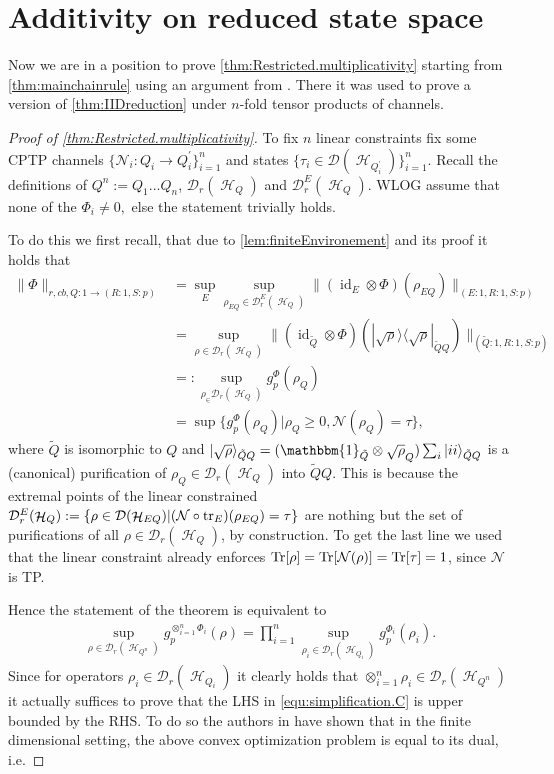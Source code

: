 \documentclass[11pt]{article}
\DeclareMathOperator{\id}{id}
\newcommand{\1}{\ensuremath{\mathbbm{1}}}
\theoremstyle{newdefinition}
\theoremstyle{newplain}
\theoremstyle{myplain}
\DeclareMathOperator{\cH}{\mathcal{H}}
\begin{document}
\section{Additivity on reduced state space}\label{app:Additivity.on.reduced.operator.spaces}


Now we are in a position to prove \cref{thm:Restricted.multiplicativity} starting from \cref{thm:mainchainrule} using an argument from \cite{Himbeeck.2025}. There it was used to prove a version of \cref{thm:IIDreduction} under $n$-fold tensor products of channels.
\begin{proof}[Proof of \cref{thm:Restricted.multiplicativity}]
To fix $n$ linear constraints fix some CPTP channels $\{\mathcal{N}_i:Q_i\to Q^\prime_i\}_{i=1}^n$ and states $\{\tau_i\in\mathcal{D}(\cH_{Q^\prime_i})\}_{i=1}^n$. Recall the definitions of $Q^n:=Q_1...Q_n$, $\mathcal{D}_r(\cH_{Q})$ and $\mathcal{D}^E_r(\cH_{Q})$.
WLOG assume that none of the $\Phi_i\neq 0,$ else the statement trivially holds.

To do this we first recall, that due to \cref{lem:finiteEnvironement} and its proof it holds that 
\begin{align}
   \|\Phi\|_{r,cb,Q:1\to(R:1,S:p)} &= \sup_{E}\sup_{\rho_{EQ}\in\mathcal{D}^E_r(\cH_Q)}\|(\id_E\otimes\Phi)(\rho_{EQ})\|_{(E:1,R:1,S:p)} \\ &= \sup_{\rho\in\mathcal{D}_r(\cH_Q)}\|(\id_{\tilde{Q}}\otimes\Phi)(|\sqrt{\rho}\rangle\langle\sqrt{\rho}|_{\tilde{Q}Q})\|_{(\tilde{Q}:1,R:1,S:p)} \\
   &=:\sup_{\rho_\in\mathcal{D}_r(\cH_{Q})}g_p^{\Phi}(\rho_Q) \\ &=\sup\{g_p^\Phi(\rho_Q)| \rho_Q\geq 0, \mathcal{N}(\rho_Q)=\tau\},
\end{align} where $\tilde{Q}$ is isomorphic to $Q$ and $|\sqrt{\rho}\rangle_{\tilde{Q}Q}=(\1_{\tilde{Q}}\otimes\sqrt{\rho}_Q)\sum_{i}|ii\rangle_{\tilde{Q} Q}$ is a (canonical) purification of $\rho_Q\in\mathcal{D}_r(\cH_{Q})$ into $\tilde{Q} Q$. This is because the extremal points of the linear constrained $\mathcal{D}_r^E(\cH_{Q}):=\{\rho\in\mathcal{D}(\cH_{EQ})|(\mathcal{N}\circ \tr_E)(\rho_{EQ})=\tau\}$ are nothing but the set of purifications of all $\rho\in\mathcal{D}_r(\cH_{Q})$, by construction. To get the last line we used that the linear constraint already enforces $\Tr[\rho]=\Tr[\mathcal{N}(\rho)]=\Tr[\tau]=1$, since $\mathcal{N}$ is TP.

Hence the statement of the theorem is equivalent to
\begin{align}\label{equ:simplification.C}
\sup_{\rho\in\mathcal{D}_r(\cH_{Q^n})}g_p^{\otimes_{i=1}^n\Phi_i}(\rho) = \prod_{i=1}^n \sup_{\rho_i\in\mathcal{D}_r(\cH_{Q_i})} g^{\Phi_i}_p(\rho_i).   
\end{align}
Since for operators $\rho_i\in\mathcal{D}_r(\cH_{Q_i})$ it clearly holds that $\otimes_{i=1}^n\rho_i\in\mathcal{D}_r(\cH_{Q^n})$ it actually suffices to prove that the LHS in \eqref{equ:simplification.C} is upper bounded by the RHS.
To do so the authors in \cite{Himbeeck.2025} have shown that in the finite dimensional setting, 
the above convex optimization problem is equal to its dual, i.e.


\end{proof}
\end{document}
